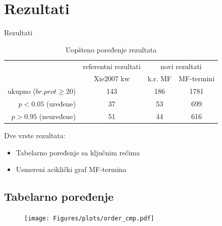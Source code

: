 \documentclass{beamer}
\begin{document}
\section{Rezultati}


\begin{frame}{Rezultati}

  \begin{table}[htpb]
    \centering
    \begin{tabular}{|r|c|c|c|}
      \hline
      & \small referentni rezultati   & \multicolumn{2}{c|}{ novi rezultati} \\
      & Xie2007 kw & k.r. MF  & MF-termini  \\
      \hline
      ukupno ($br. prot\ge20$)   & 143  & 186    & 1781          \\
      $p<0.05$ (uređene)         & 37   & 53     & 699           \\
      $p>0.95$ (neuređene)       & 51   & 44     & 616           \\
      \hline
    \end{tabular}
  \caption{Uopšteno poređenje rezultata}
  \end{table}


  Dve vrste rezultata:
  \begin{itemize}
    \item Tabelarno poređenje sa ključnim rečima
    \item Usmereni aciklički graf MF-termina
  \end{itemize}

\end{frame}

\subsection{Tabelarno poređenje}



\begin{frame}
  \begin{figure}[th]
    \vspace*{-0.8cm}
    \hspace*{-0.45cm}
    \texttt{[image: Figures/plots/order\_cmp.pdf]}
  \end{figure}
\end{frame}
\end{document}
